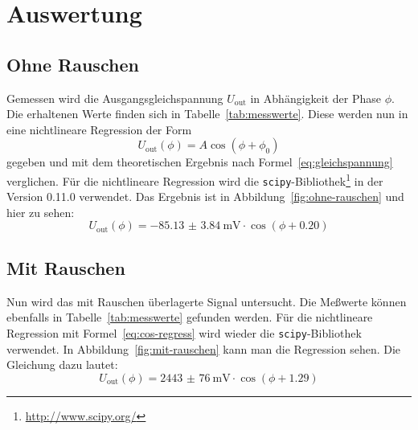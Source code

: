 
\section{Auswertung}

\subsection{Ohne Rauschen}

Gemessen wird die Ausgangsgleichspannung $U_\text{out}$ in Abhängigkeit
der Phase $\phi$. Die erhaltenen Werte finden sich in
Tabelle~\ref{tab:messwerte}. Diese werden nun in eine nichtlineare
Regression der Form
%
\begin{equation}
  \label{eq:cos-regress}
  U_\text{out}(\phi) = A\cos(\phi+\phi_0)
\end{equation}
%
gegeben und mit dem theoretischen Ergebnis nach
Formel~\eqref{eq:gleichspannung} verglichen. Für die nichtlineare
Regression wird die
\texttt{scipy}-Bibliothek\footnote{\url{http://www.scipy.org/}} in der
Version 0.11.0 verwendet. Das Ergebnis ist in
Abbildung~\ref{fig:ohne-rauschen} und hier zu sehen:
%
\begin{equation}
  \label{eq:cos-regress-result}
  U_\text{out}(\phi) = \SI{-85.13(384)}{\milli\volt} \cdot
  \cos(\phi + \num{0.20})
\end{equation}

\subsection{Mit Rauschen}

Nun wird das mit Rauschen überlagerte Signal untersucht. Die Meßwerte
können ebenfalls in Tabelle~\ref{tab:messwerte} gefunden werden. Für die
nichtlineare Regression mit Formel~\eqref{eq:cos-regress} wird wieder
die \texttt{scipy}-Bibliothek verwendet. In
Abbildung~\ref{fig:mit-rauschen} kann man die Regression sehen. Die
Gleichung dazu lautet:
%
\begin{equation}
  \label{eq:cos-regress-result-noise}
  U_\text{out}(\phi) = \SI{2443(76)}{\milli\volt} \cdot 
  \cos(\phi + \num{1.29})
\end{equation}


